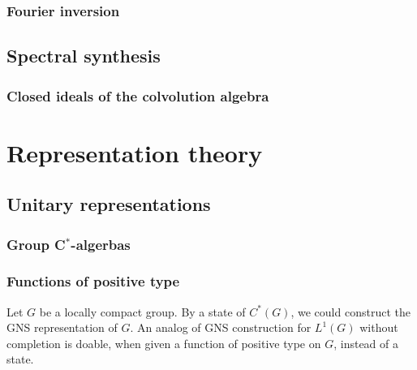 \documentclass{../../large}
\begin{document}
\section{Fourier inversion}
\begin{prb}
\end{prb}
\begin{prb}
\end{prb}
\begin{prb}
\end{prb}
\begin{prb}
\end{prb}


\chapter{Spectral synthesis}
\section{Closed ideals of the colvolution algebra}








\part{Representation theory}
\chapter{Unitary representations}
\section{}
\begin{prb}
\end{prb}
\section{Group C$^*$-algerbas}
\begin{prb}
\end{prb}
\section{Functions of positive type}
\begin{prb}
\end{prb}
\begin{prb}
\end{prb}
\begin{prb}
Let $G$ be a locally compact group.
By a state of $C^*(G)$, we could construct the GNS representation of $G$.
An analog of GNS construction for $L^1(G)$ without completion is doable, when given a function of positive type on $G$, instead of a state.
\end{prb}
\end{document}
